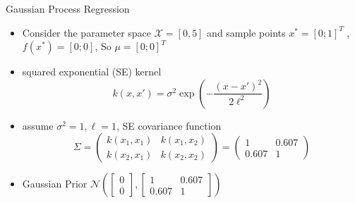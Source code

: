 \begin{frame}{Gaussian Process Regression}
\begin{itemize}
\item Consider the parameter space \( \mathcal{X} = [0, 5] \) and sample points 
\(x^* = [0;1]^T \) , \( f(x^*) = [0;0] \), So \( \mu = [0;0]^T \)
\item squared exponential (SE) kernel \[k(x, x') = \sigma^2 \exp \left( -\frac{(x - x')^2}{2\ell^2} \right)\] 
\item assume \(\sigma^2 = 1, \ell =1\), SE covariance function \[
\Sigma = 
\begin{pmatrix}
k(x_1, x_1) & k(x_1, x_2) \\
k(x_2, x_1) & k(x_2, x_2)
\end{pmatrix} =
\begin{pmatrix}
1 & 0.607 \\
0.607 & 1
\end{pmatrix}
\]
\item Gaussian Prior \(\mathcal{N}\left(\begin{bmatrix}0 \\0\end{bmatrix}, \begin{bmatrix}1 & 0.607 \\0.607 & 1 \end{bmatrix}\right)\)
\end{itemize}
\end{frame}

    
